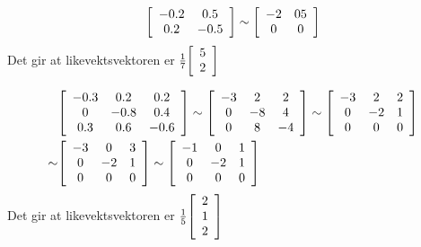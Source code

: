 \documentclass[11pt, a4paper, norsk]{NTNUoving}
\newenvironment{pkt}{\begin{punkt}}{\end{punkt}}
\newenvironment{matrise}[1][c]
{
\left[\begin{array}{#1}
}
{    
\end{array}\right]           
}
\begin{document}
\begin{oppgave}
    \begin{pkt}
        \begin{align*}
            \begin{matrise}[cc]
                -0.2 & 0.5 \\ 0.2 & -0.5
            \end{matrise} \sim \begin{matrise}[cc]
                -2 & 05 \\ 0 & 0
            \end{matrise} 
        \end{align*}
        Det gir at likevektsvektoren er $\frac{1}{7}\begin{matrise}
        5\\2
        \end{matrise}$
    \end{pkt}
    \begin{pkt}
        \begin{align*}
            &\begin{matrise}[ccc]
                -0.3 & 0.2 & 0.2 \\ 0 & -0.8 & 0.4 \\ 0.3 & 0.6 & -0.6
            \end{matrise} \sim \begin{matrise}[ccc]
                -3 & 2 & 2 \\ 0 & -8 & 4 \\ 0 & 8 & -4
            \end{matrise} \sim \begin{matrise}[ccc]
                -3 & 2 & 2 \\ 0 & -2 & 1 \\ 0 & 0 & 0
            \end{matrise}\\ \sim& \begin{matrise}[ccc]
                -3 & 0 & 3 \\ 0 & -2 & 1 \\ 0 & 0 & 0
            \end{matrise} \sim \begin{matrise}[ccc]
                -1 & 0 & 1 \\ 0 & -2 & 1 \\ 0 & 0 & 0
            \end{matrise}
        \end{align*}
        Det gir at likevektsvektoren er $\frac{1}{5}\begin{matrise}
        2\\1\\2
        \end{matrise}$
    \end{pkt}
\end{oppgave}
\end{document}
